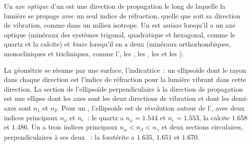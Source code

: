 \begin{definition}\label{def:b1:optical-mineralogy:optic-axis}
Un \emph{axe optique} d'un  est une direction de propagation le long de
laquelle la lumière se propage avec un seul indice de réfraction, quelle que soit
sa direction de vibration, comme dans un milieu isotrope. Un  est
\emph{uniaxe} lorsqu'il a un axe optique (minéraux des systèmes
trigonal, quadratique et hexagonal, comme le quartz et la calcite) et
\emph{biaxe} lorsqu'il en a deux (minéraux orthorhombiques,
monocliniques et tricliniques, comme l', les , les ,
les  et les ).
\end{definition}

La géométrie se résume par une surface, l'indicatrice~: un ellipsoïde dont le
rayon dans chaque direction est l'indice de réfraction pour la lumière vibrant
dans cette direction. La section de l'ellipsoïde perpendiculaire à la direction
de propagation est une ellipse dont les axes sont les deux directions de
vibration et dont les demi-axes sont $n_1$ et $n_2$. Pour un  ,
l'ellipsoïde est de révolution autour de l', avec deux indices
principaux $n_\omega$ et $n_\varepsilon$~: le quartz a $n_\omega = 1.544$ et
$n_\varepsilon = 1.553$, la calcite $1.658$ et $1.486$.
Un   a trois indices principaux $n_\alpha < n_\beta < n_\gamma$ et
deux sections circulaires, perpendiculaires à ses deux ~: la
forstérite a $1.635$, $1.651$ et $1.670$.

